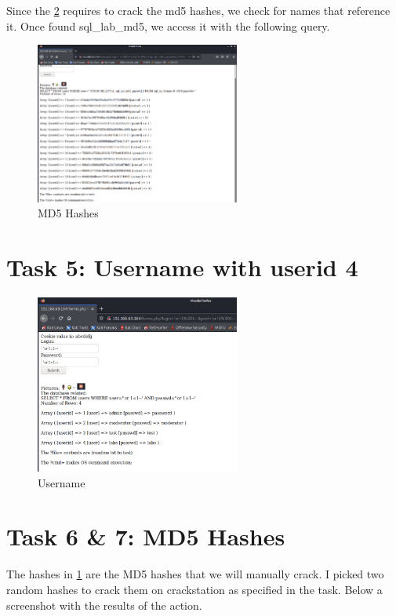 Since the \ref{s:task6-7-md5-hash-tokens} requires to crack the md5 hashes, we
check for names that reference it.
Once found sql\_lab\_md5, we access it with the following query.
\begin{figure}[H]
  \centering
  \includegraphics[width=0.6\textwidth]{figures/md5-hashes}
  \caption{MD5 Hashes}
  \label{f:md5-hashes}
\end{figure}

\section{Task 5: Username with userid 4}
\label{task5-username}

\begin{figure}[H]
  \centering
  \includegraphics[width=0.6\textwidth]{figures/tables}
  \caption{Username}
  \label{f:username}
\end{figure}

\section{Task 6 \& 7: MD5 Hashes}
\label{s:task6-7-md5-hash-tokens}
The hashes in \ref{f:md5-hashes} are the MD5 hashes that we will manually crack.
I picked two random hashes to crack them on crackstation as specified in the task.
Below a screenshot with the results of the action.

